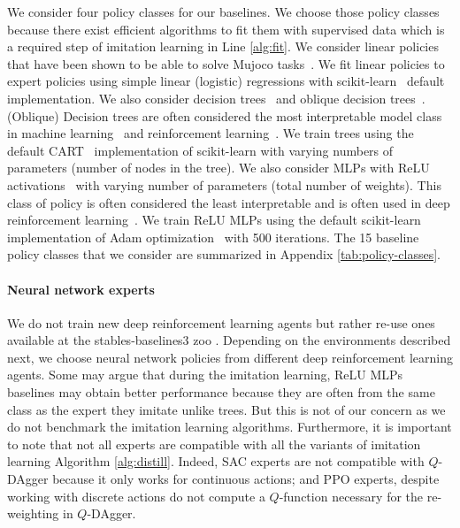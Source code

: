  We consider four policy classes for our baselines. We choose those policy classes because there exist efficient algorithms to fit them with supervised data which is a required step of imitation learning in Line \ref{alg:fit}. We consider linear policies that have been shown to be able to solve Mujoco tasks~\cite{empirical-evidence}. We fit linear policies to expert policies using simple linear (logistic) regressions with scikit-learn~\cite{scikit-learn} default implementation. We also consider decision trees~\cite{cart} and oblique decision trees~\cite{oblique}. (Oblique) Decision trees are often considered the most interpretable model class in machine learning~\cite{mythos} and reinforcement learning~\cite{viper,IBMDP,glanois-survey,milani-survey}. We train trees using the default CART~\cite{cart} implementation of scikit-learn with varying numbers of parameters (number of nodes in the tree). We also consider MLPs with ReLU activations~\cite{relunet} with varying number of parameters (total number of weights). This class of policy is often considered the least interpretable and is often used in deep reinforcement learning~\cite{deep-rl-relu1,deep-rl-relu2,deep-rl-relu3}. We train ReLU MLPs using the default scikit-learn implementation of Adam optimization~\cite{adam} with 500 iterations. The 15 baseline policy classes that we consider are summarized in Appendix \ref{tab:policy-classes}. 
\paragraph{Neural network experts}
We do not train new deep reinforcement learning agents \cite{dqn,ppo,deep-rl-relu1} but rather re-use ones available at the stables-baselines3 zoo \cite{zoo}. Depending on the environments described next, we choose neural network policies from different deep reinforcement learning agents. Some may argue that during the imitation learning, ReLU MLPs baselines may obtain better performance because they are often from the same class as the expert they imitate unlike trees. But this is not of our concern as we do not benchmark the imitation learning algorithms. Furthermore, it is important to note that not all experts are compatible with all the variants of imitation learning Algorithm \ref{alg:distill}. Indeed, SAC experts \cite{deep-rl-relu1} are not compatible with $Q$-DAgger \cite{viper} because it only works for continuous actions; and PPO experts, despite working with discrete actions do not compute a $Q$-function necessary for the re-weighting in $Q$-DAgger.

